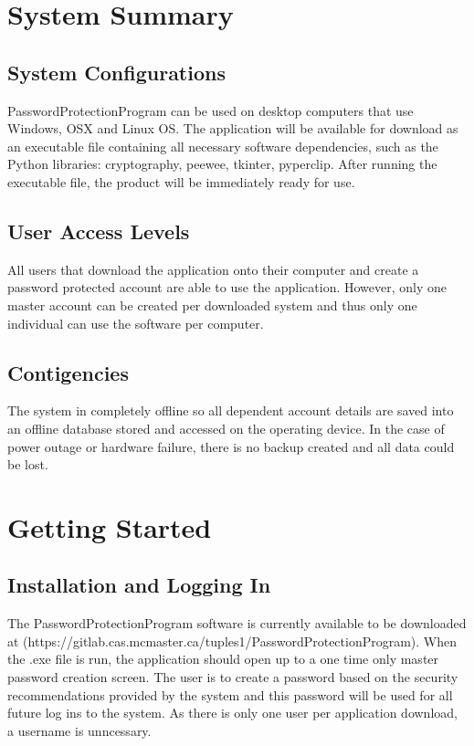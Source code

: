 \documentclass[12pt, titlepage]{article}
\begin{document}
\section{System Summary} \label{SysSumm}


\subsection{System Configurations} \label{SysConf}

PasswordProtectionProgram can be used on desktop computers that use Windows, OSX and Linux OS. The application will be available for download as an executable file containing all necessary software dependencies, such as the Python libraries: cryptography, peewee, tkinter, pyperclip. After running the executable file, the product will be immediately ready for use.


\subsection{User Access Levels} \label{UserAcc}

All users that download the application onto their computer and create a password protected account are able to use the application. However, only one master account can be created per downloaded system and thus only one individual can use the software per computer.


\subsection{Contigencies} \label{Contigs}

The system in completely offline so all dependent account details are saved into an offline database stored and accessed on the operating device. In the case of power outage or hardware failure, there is no backup created and all data could be lost.


\section{Getting Started} \label{GetStart}

\subsection{Installation and Logging In} \label{install}

The PasswordProtectionProgram software is currently available to be downloaded at (https://gitlab.cas.mcmaster.ca/tuples1/PasswordProtectionProgram). When the .exe file is run, the application should open up to a one time only master password creation screen. The user is to create a password based on the security recommendations provided by the system and this password will be used for all future log ins to the system. As there is only one user per application download, a username is unncessary.
\end{document}
